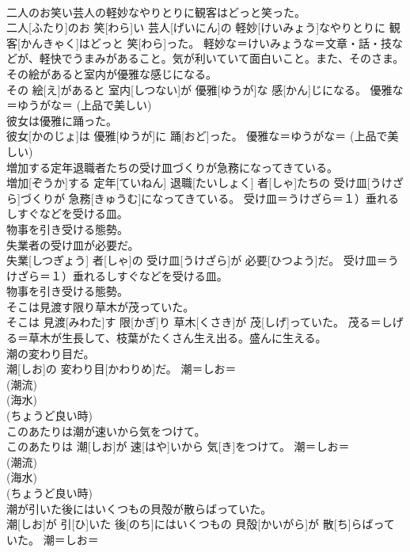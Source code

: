 \documentclass[8pt]{extreport}
\begin{document}
\begin{CJK}{UTF8}{min}
{\\	二人のお笑い芸人の軽妙なやりとりに観客はどっと笑った。	
\\	二人[ふたり]のお 笑[わら]い 芸人[げいにん]の 軽妙[けいみょう]なやりとりに 観客[かんきゃく]はどっと 笑[わら]った。	軽妙な＝けいみょうな＝文章・話・技などが、軽快でうまみがあること。気が利いていて面白いこと。また、そのさま。
\\	その絵があると室内が優雅な感じになる。	
\\	その 絵[え]があると 室内[しつない]が 優雅[ゆうが]な 感[かん]じになる。	優雅な＝ゆうがな＝ (上品で美しい) 
\\	彼女は優雅に踊った。	
\\	彼女[かのじょ]は 優雅[ゆうが]に 踊[おど]った。	優雅な＝ゆうがな＝ (上品で美しい) 
\\	増加する定年退職者たちの受け皿づくりが急務になってきている。	
\\	増加[ぞうか]する 定年[ていねん] 退職[たいしょく] 者[しゃ]たちの 受け皿[うけざら]づくりが 急務[きゅうむ]になってきている。	受け皿＝うけざら＝１）垂れるしすぐなどを受ける皿。 　　　　　　　　　
\\	物事を引き受ける態勢。
\\	失業者の受け皿が必要だ。	
\\	失業[しつぎょう] 者[しゃ]の 受け皿[うけざら]が 必要[ひつよう]だ。	受け皿＝うけざら＝１）垂れるしすぐなどを受ける皿。 　　　　　　　　　
\\	物事を引き受ける態勢。
\\	そこは見渡す限り草木が茂っていた。	
\\	そこは 見渡[みわた]す 限[かぎ]り 草木[くさき]が 茂[しげ]っていた。	茂る＝しげる＝草木が生長して、枝葉がたくさん生え出る。盛んに生える。
\\	潮の変わり目だ。	
\\	潮[しお]の 変わり目[かわりめ]だ。	潮＝しお＝ 
\\	(潮流) 
\\	(海水) 
\\	(ちょうど良い時) 
\\	このあたりは潮が速いから気をつけて。	
\\	このあたりは 潮[しお]が 速[はや]いから 気[き]をつけて。	潮＝しお＝ 
\\	(潮流) 
\\	(海水) 
\\	(ちょうど良い時) 
\\	潮が引いた後にはいくつもの貝殻が散らばっていた。	
\\	潮[しお]が 引[ひ]いた 後[のち]にはいくつもの 貝殻[かいがら]が 散[ち]らばっていた。	潮＝しお＝ 
}
\end{CJK}
\end{document}
